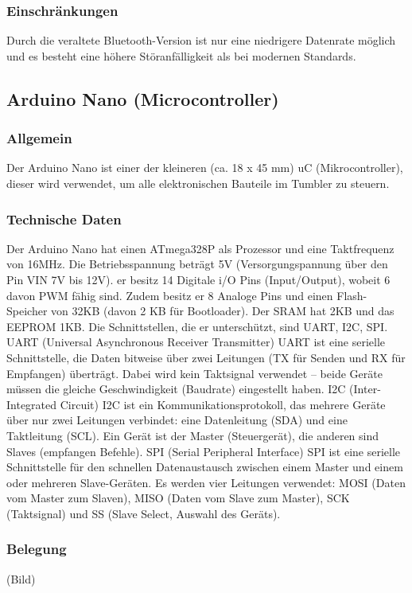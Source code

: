 \subsubsection{Einschränkungen}
Durch die veraltete Bluetooth-Version ist nur eine niedrigere Datenrate möglich und es besteht eine höhere Störanfälligkeit als bei modernen Standards.
%
\subsection{Arduino Nano (Microcontroller)}
%
\subsubsection{Allgemein}
Der Arduino Nano ist einer der kleineren (ca. 18 x 45 mm) uC (Mikrocontroller), dieser wird verwendet, um alle elektronischen Bauteile im Tumbler zu steuern.
\subsubsection{Technische Daten}
Der Arduino Nano hat einen ATmega328P als Prozessor und eine Taktfrequenz von 16MHz. Die Betriebsspannung beträgt 5V (Versorgungspannung über den Pin VIN 7V bis 12V). 
er besitz 14 Digitale i/O Pins (Input/Output), wobeit 6 davon PWM fähig sind. Zudem besitz er 8 Analoge Pins und einen Flash-Speicher von 32KB (davon 2 KB für Bootloader). 
Der SRAM hat 2KB und das EEPROM 1KB. Die Schnittstellen, die er unterschützt, sind UART, I2C, SPI.
UART (Universal Asynchronous Receiver Transmitter)
UART ist eine serielle Schnittstelle, die Daten bitweise über zwei Leitungen (TX für Senden und RX für Empfangen) überträgt. 
Dabei wird kein Taktsignal verwendet – beide Geräte müssen die gleiche Geschwindigkeit (Baudrate) eingestellt haben.
I2C (Inter-Integrated Circuit)
I2C ist ein Kommunikationsprotokoll, das mehrere Geräte über nur zwei Leitungen verbindet: eine Datenleitung (SDA) und eine Taktleitung (SCL). 
Ein Gerät ist der Master (Steuergerät), die anderen sind Slaves (empfangen Befehle).
SPI (Serial Peripheral Interface)
SPI ist eine serielle Schnittstelle für den schnellen Datenaustausch zwischen einem Master und einem oder mehreren Slave-Geräten. 
Es werden vier Leitungen verwendet: MOSI (Daten vom Master zum Slaven), MISO (Daten vom Slave zum Master), SCK (Taktsignal) und SS (Slave Select, Auswahl des Geräts).
\subsubsection{Belegung}
(Bild)
